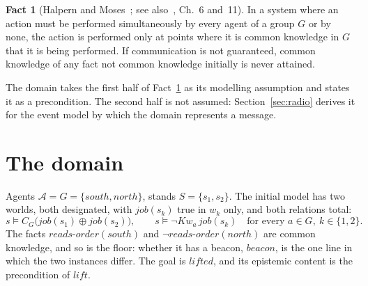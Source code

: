 \documentclass[11pt,a4paper]{article}
\theoremstyle{definition}
\newtheorem{fact}{Fact}
\newcommand{\Ag}{\mathcal{A}}
\newcommand{\Cop}[1]{C_{#1}}
\newcommand{\Kw}[1]{\mathit{Kw}_{#1}}
\newcommand{\ag}[1]{\mathit{#1}}
\newcommand{\job}{\mathit{job}}
\begin{document}
\begin{fact}[Halpern and Moses~\cite{halpern1990}; see also~\cite{fhmv1995}, Ch.~6 and~11]
\label{fact:hm}
In a system where an action must be performed simultaneously by every agent of
a group $G$ or by none, the action is performed only at points where it is
common knowledge in $G$ that it is being performed. If communication is not
guaranteed, common knowledge of any fact not common knowledge initially is
never attained.
\end{fact}

\noindent
The domain takes the first half of Fact~\ref{fact:hm} as its modelling
assumption and states it as a precondition. The second half is not assumed:
Section~\ref{sec:radio} derives it for the event model by which the domain
represents a message.

\section{The domain}
\label{sec:domain}

Agents $\Ag = G = \{\ag{south}, \ag{north}\}$, stands $S = \{s_1, s_2\}$. The
initial model has two worlds, both designated, with $\job(s_k)$ true in $w_k$
only, and both relations total:
\[
  s \models \Cop{G}\big(\job(s_1) \oplus \job(s_2)\big),
  \qquad
  s \models \neg\Kw{a}\,\job(s_k) \quad \text{for every } a \in G,\ k \in \{1,2\}.
\]
The facts $\mathit{reads\text{-}order}(\ag{south})$ and
$\neg\mathit{reads\text{-}order}(\ag{north})$ are common knowledge, and so is
the floor: whether it has a beacon, $\mathit{beacon}$, is the one line in which
the two instances differ. The goal is $\mathit{lifted}$, and its epistemic
content is the precondition of $\mathit{lift}$.
\end{document}
